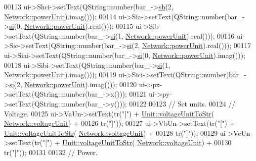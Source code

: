 \begin{DoxyCode}
00113   ui->Shci->setText(QString::number(bar\_->\hyperlink{group___models_gac020fff2f22a9caab71f21205b5773f8}{sh}(2, \hyperlink{group___models_ga9504015bc566f4a3d3b4d4a86000293b}{Network::powerUnit}).imag()));
00114   ui->Sia->setText(QString::number(bar\_->\hyperlink{group___models_ga9af07eb85c2c76eb3bc73e25bb842c1e}{si}(0, \hyperlink{group___models_ga9504015bc566f4a3d3b4d4a86000293b}{Network::powerUnit}).real()));
00115   ui->Sib->setText(QString::number(bar\_->\hyperlink{group___models_ga9af07eb85c2c76eb3bc73e25bb842c1e}{si}(1, \hyperlink{group___models_ga9504015bc566f4a3d3b4d4a86000293b}{Network::powerUnit}).real()));
00116   ui->Sic->setText(QString::number(bar\_->\hyperlink{group___models_ga9af07eb85c2c76eb3bc73e25bb842c1e}{si}(2, \hyperlink{group___models_ga9504015bc566f4a3d3b4d4a86000293b}{Network::powerUnit}).real()));
00117   ui->Siai->setText(QString::number(bar\_->\hyperlink{group___models_ga9af07eb85c2c76eb3bc73e25bb842c1e}{si}(0, \hyperlink{group___models_ga9504015bc566f4a3d3b4d4a86000293b}{Network::powerUnit}).imag()));
00118   ui->Sibi->setText(QString::number(bar\_->\hyperlink{group___models_ga9af07eb85c2c76eb3bc73e25bb842c1e}{si}(1, \hyperlink{group___models_ga9504015bc566f4a3d3b4d4a86000293b}{Network::powerUnit}).imag()));
00119   ui->Sici->setText(QString::number(bar\_->\hyperlink{group___models_ga9af07eb85c2c76eb3bc73e25bb842c1e}{si}(2, \hyperlink{group___models_ga9504015bc566f4a3d3b4d4a86000293b}{Network::powerUnit}).imag()));
00120   ui->px->setText(QString::number(bar\_->x()));
00121   ui->py->setText(QString::number(bar\_->y()));
00122 
00123   \textcolor{comment}{// Set units.}
00124   \textcolor{comment}{// Voltage.}
00125   ui->VaUn->setText(tr(\textcolor{stringliteral}{"["}) + \hyperlink{class_unit_a7fa103c31f9f069961b35b6371ff0c0a}{Unit::voltageUnitToStr}(
      \hyperlink{group___models_gacde031ef95f5c05565ee35769f2ed89e}{Network::voltageUnit}) +
00126                     tr(\textcolor{stringliteral}{"]"}));
00127   ui->VbUn->setText(tr(\textcolor{stringliteral}{"["}) + \hyperlink{class_unit_a7fa103c31f9f069961b35b6371ff0c0a}{Unit::voltageUnitToStr}(
      \hyperlink{group___models_gacde031ef95f5c05565ee35769f2ed89e}{Network::voltageUnit}) +
00128                     tr(\textcolor{stringliteral}{"]"}));
00129   ui->VcUn->setText(tr(\textcolor{stringliteral}{"["}) + \hyperlink{class_unit_a7fa103c31f9f069961b35b6371ff0c0a}{Unit::voltageUnitToStr}(
      \hyperlink{group___models_gacde031ef95f5c05565ee35769f2ed89e}{Network::voltageUnit}) +
00130                     tr(\textcolor{stringliteral}{"]"}));
00131 
00132   \textcolor{comment}{// Power.}

\end{DoxyCode}
